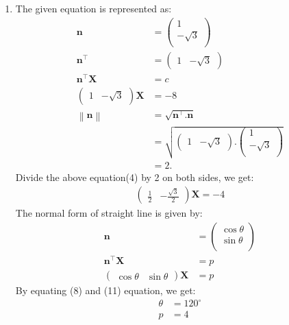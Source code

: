 \documentclass[12pt]{article}
\providecommand{\norm}[1]{\left\lVert#1\right\rVert}
\newcommand{\myvec}[1]{\ensuremath{\begin{pmatrix}#1\end{pmatrix}}}
\let\vec\mathbf
\begin{document}
\begin{enumerate}
\item The given equation is represented as:
	\begin{align}
	\vec{n}&=\myvec{1\\-\sqrt{3}\\}\\
	\vec{n}^\top&=\myvec{1 & -\sqrt{3}}\\
	\vec{n}^\top \vec{X}&= c\\
	\myvec{1 & -\sqrt{3}} \vec{X}&=-8\\
	\norm{\vec{n}}&=\sqrt{\vec{n}^\top.\vec{n}}\\&=\sqrt{\myvec{1&-\sqrt{3}}.\myvec{1\\-\sqrt{3}\\}}\\&=2.	
\end{align}	
	Divide the above equation(4) by 2 on both sides, we get: 
	\begin{align}
	\myvec{\frac{1}{2} & -\frac{\sqrt{3}}{2}}\vec{X}=-4
	\end{align}
	The normal form of straight line is given by:
	\begin{align}
	\vec{n}&=\myvec{\cos \theta\\\sin\theta\\}\\
	\vec{n}^\top \vec{X}&= p\\
	\myvec{\cos\theta & \sin\theta}\vec{X}&=p
	\end{align}
	By equating (8) and (11) equation, we get:
	\begin{align}
	\theta&=120^\circ\\
	p&=4
	\end{align}
	


\end{enumerate}
\end{document}
